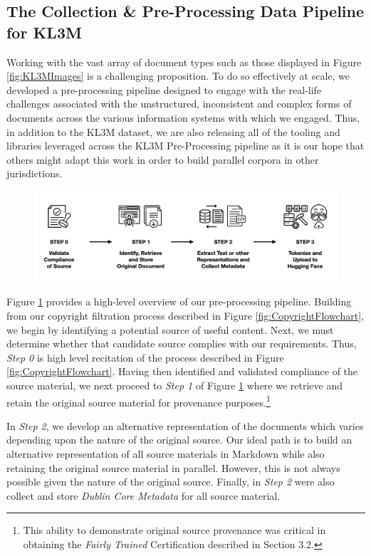 \subsection{The Collection \& Pre-Processing Data Pipeline for KL3M}
Working with the vast array of document types such as those displayed in Figure \ref{fig:KL3MImages} is a challenging proposition.  To do so effectively at scale, we developed a pre-processing pipeline designed to engage with the real-life challenges associated with the unstructured, inconsistent and complex forms of documents across the various information systems with which we engaged.  Thus, in addition to the KL3M dataset, we are also releasing all of the tooling and libraries leveraged across the KL3M Pre-Processing pipeline as it is our hope that others might adapt this work in order to build parallel corpora in other jurisdictions.   

\begin{figure}[h!]
\centering
\includegraphics[width=150mm]{PreProcessing.png}
\caption{}
\label{fig:preprocessing}
\end{figure}


Figure \ref{fig:preprocessing} provides a high-level overview of our pre-processing pipeline.  Building from our copyright filtration process described in Figure \ref{fig:CopyrightFlowchart}, we begin by identifying a potential source of useful content.  Next, we must determine whether that candidate source complies with our requirements. Thus, \textit{Step 0} is high level recitation of the process described in Figure \ref{fig:CopyrightFlowchart}.  Having then identified and validated compliance of the source material, we next proceed to \textit{Step 1} of Figure \ref{fig:preprocessing} where we retrieve and retain the original source material for provenance purposes.\footnote{This ability to demonstrate original source provenance was critical in obtaining the \textit{Fairly Trained} Certification described in Section 3.2.}  

In \textit{Step 2}, we develop an alternative representation of the documents which varies depending upon the nature of the original source.  Our ideal path is to build an alternative representation of all source materials in Markdown \cite{mailund2019beginner} while also retaining the original source material in parallel.  However, this is not always possible given the nature of the original source.  Finally, in \textit{Step 2} were also collect and store \textit{Dublin Core Metadata} for all source material.  

